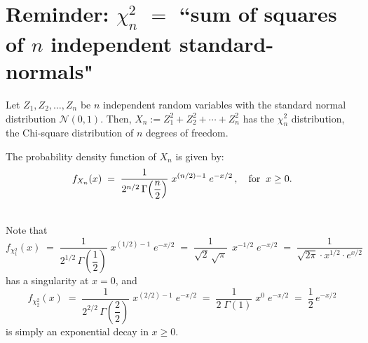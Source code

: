 \documentclass{article}
\begin{document}


\pagestyle{fancy}

%

\lfoot[]{}
\cfoot[]{}
\rfoot[]{\thepage}



\section{Reminder: $\chi^{2}_{n}$ \;$=$\; ``sum of squares of $n$ independent standard-normals"}
\setcounter{theorem}{0}

Let $Z_{1}, Z_{2}, \ldots, Z_{n}$ be $n$ independent random variables with the standard normal distribution $\mathcal{N}(0,1)$.  Then,
$X_{n} := Z_{1}^{2} + Z_{2}^{2} + \cdots + Z_{n}^{2}$ has the $\chi^{2}_{n}$ distribution, the Chi-square distribution of $n$ degrees of freedom.

The probability density function of $X_{n}$ is given by:
\begin{equation*}
f_{X_{n}}(x) \; = \; \dfrac{1}{2^{n/2}\,\Gamma\!\left(\dfrac{n}{2}\right)} \; x^{(n/2)-1} \; e^{-x/2}\,,
\quad\textnormal{for}\;\; x \geq 0.
\end{equation*}

\begin{remark}\mbox{}\\
Note that
\begin{equation*}
          f_{\chi^{2}_{1}}(x)
\; = \; \dfrac{1}{2^{1/2}\,\Gamma\!\left(\dfrac{1}{2}\right)} \; x^{(1/2)-1} \; e^{-x/2}
\; = \; \dfrac{1}{\sqrt{2}\,\sqrt{\pi}}\;\,x^{-1/2} \; e^{-x/2}
\; = \; \dfrac{1}{\sqrt{2\pi} \cdot x^{1/2} \cdot e^{x/2}}
\end{equation*}
has a singularity at $x=0$, and
\begin{equation*}
          f_{\chi^{2}_{2}}(x)
\; = \; \dfrac{1}{2^{2/2}\,\Gamma\!\left(\dfrac{2}{2}\right)} \; x^{(2/2)-1} \; e^{-x/2}
\; = \; \dfrac{1}{{2}\;\Gamma\!\left(1\right)}\;x^{0} \; e^{-x/2}
\; = \; \dfrac{1}{2}\,e^{-x/2}
\end{equation*}
is simply an exponential decay in $x \geq 0$.
\end{remark}
\end{document}
